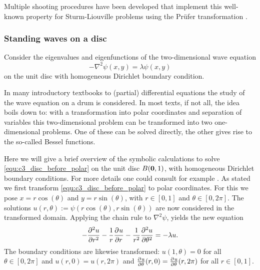 Multiple shooting procedures \cite{baeyens_fast_2020,ledoux_matslise_2016,ixaru_cp_2000} have been developed that implement this well-known property for Sturm-Liouville problems using the Prüfer transformation \cite{pruefer_neue_1926}.

\subsubsection{Standing waves on a disc}\label{sec:c3_standing_waves_on_disc}

Consider the eigenvalues and eigenfunctions of the two-dimensional wave equation
\begin{equation}\label{equ:c3_disc_before_polar}
  -\nabla^2 \psi(x, y) = \lambda \psi(x, y)
\end{equation}
on the unit disc with homogeneous Dirichlet boundary condition.

In many introductory textbooks to (partial) differential equations the study of the wave equation on a drum is considered. In most texts, if not all, the idea boils down to: with a transformation into polar coordinates and separation of variables this two-dimensional problem can be transformed into two one-dimensional problems. One of these can be solved directly, the other gives rise to the so-called Bessel functions.

Here we will give a brief overview of the symbolic calculations to solve \eqref{equ:c3_disc_before_polar} on the unit disc $B(\vb{0}, 1)$, with homogeneous Dirichlet boundary conditions. For more details one could consult for example \cite[chapter~4]{asmar_partial_2005}. As stated we first transform \eqref{equ:c3_disc_before_polar} to polar coordinates. For this we pose $x = r\cos(\theta)$ and $y = r\sin(\theta)$, with $r \in [0,1]$ and $\theta \in [0, 2\pi]$. The solutions $u(r, \theta) := \psi(r\cos(\theta), r\sin(\theta))$ are now considered in the transformed domain. Applying the chain rule to $\nabla^2\psi$, yields the new equation
\begin{equation}\label{equ:c3_disc_after_polar}
  -{\pdv[2]{u}{r}} - \frac{1}{r}{\pdv[]{u}{r}} - \frac{1}{r^2} {\pdv[2]{u}{\theta}} = - \lambda u\text{.}
\end{equation}
The boundary conditions are likewise transformed: $u(1, \theta) = 0$ for all $\theta \in [0, 2\pi]$ and $u(r, 0) = u(r, 2\pi)$ and ${\pdv[]{u}{\theta}}(r, 0) = {\pdv[]{u}{\theta}}(r, 2\pi)$ for all $r \in [0, 1]$.

